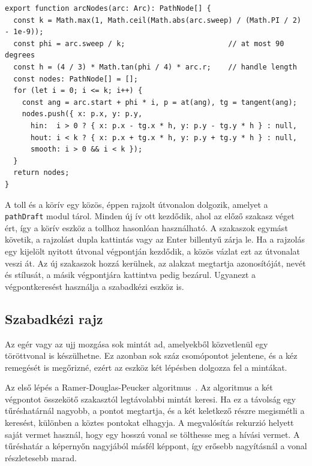 \begin{lstlisting}[style=TS, caption={Körív felbontása Bézier-csomópontokra (\texttt{utils/arc.ts}, rövidítve)}, label=lst:arcnodes]
export function arcNodes(arc: Arc): PathNode[] {
  const k = Math.max(1, Math.ceil(Math.abs(arc.sweep) / (Math.PI / 2) - 1e-9));
  const phi = arc.sweep / k;                        // at most 90 degrees
  const h = (4 / 3) * Math.tan(phi / 4) * arc.r;    // handle length
  const nodes: PathNode[] = [];
  for (let i = 0; i <= k; i++) {
    const ang = arc.start + phi * i, p = at(ang), tg = tangent(ang);
    nodes.push({ x: p.x, y: p.y,
      hin:  i > 0 ? { x: p.x - tg.x * h, y: p.y - tg.y * h } : null,
      hout: i < k ? { x: p.x + tg.x * h, y: p.y + tg.y * h } : null,
      smooth: i > 0 && i < k });
  }
  return nodes;
}
\end{lstlisting}

A toll és a körív egy közös, éppen rajzolt útvonalon dolgozik, amelyet a \texttt{pathDraft} modul tárol. Minden új ív ott kezdődik, ahol az előző szakasz véget ért, így a körív eszköz a tollhoz hasonlóan használható. A szakaszok egymást követik, a rajzolást dupla kattintás vagy az Enter billentyű zárja le. Ha a rajzolás egy kijelölt nyitott útvonal végpontján kezdődik, a közös vázlat ezt az útvonalat veszi át. Az új szakaszok hozzá kerülnek, az alakzat megtartja azonosítóját, nevét és stílusát, a másik végpontjára kattintva pedig bezárul. Ugyanezt a végpontkeresést használja a szabadkézi eszköz is.

\subsection{Szabadkézi rajz}

Az egér vagy az ujj mozgása sok mintát ad, amelyekből közvetlenül egy töröttvonal is készülhetne. Ez azonban sok száz csomópontot jelentene, és a kéz remegését is megőrizné, ezért az eszköz két lépésben dolgozza fel a mintákat.

Az első lépés a Ramer-Douglas-Peucker algoritmus~\cite{douglas-peucker,ramer}. Az algoritmus a két végpontot összekötő szakasztól legtávolabbi mintát keresi. Ha ez a távolság egy tűréshatárnál nagyobb, a pontot megtartja, és a két keletkező részre megismétli a keresést, különben a köztes pontokat elhagyja. A megvalósítás rekurzió helyett saját vermet használ, hogy egy hosszú vonal se tölthesse meg a hívási vermet. A tűréshatár a képernyőn nagyjából másfél képpont, így erősebb nagyításnál a vonal részletesebb marad.


